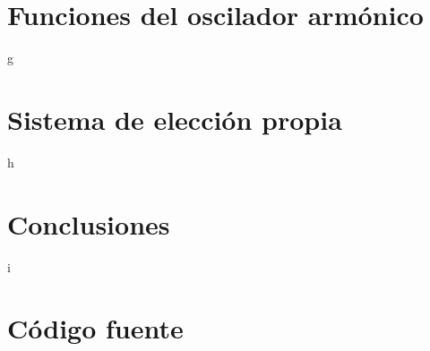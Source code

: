 \documentclass[twocolumn, aps, prd, 10pt, superscriptaddress, nofootinbib]{revtex4-2}
\begin{document}
\section{Funciones del oscilador armónico}

g
\section{Sistema de elección propia}

h
\section{Conclusiones}

i



\newpage
\onecolumngrid
\appendix
\section{Código fuente}






\end{document}
